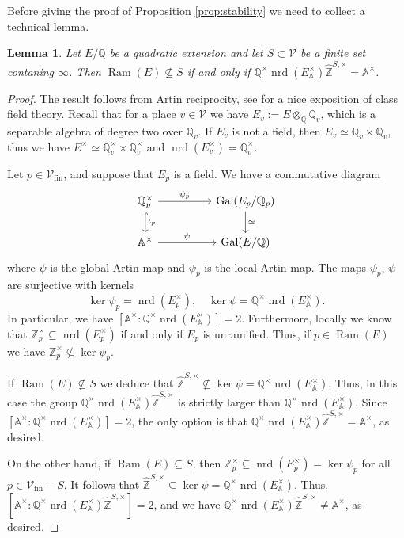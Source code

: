 \documentclass{article}
\newtheorem{lem}{Lemma}[section]
\theoremstyle{named}
\newcommand{\Z}{\mathbb{Z}}
\newcommand{\A}{\mathbb{A}}
\newcommand{\Q}{\mathbb{Q}}
\newcommand{\Pl}{\mathcal{V}}
\newcommand{\Primes}{\mathcal{V}_{\text{fin}}}
\DeclareMathOperator{\Gal}{Gal}
\DeclareMathOperator{\Ram}{Ram}
\DeclareMathOperator{\nrd}{nrd}
\begin{document}
Before giving the proof of Proposition \ref{prop:stability} we need to collect a technical lemma. 

\begin{lem}\label{lem:subgroupequaltoideles}
Let $E/\Q$ be a quadratic extension and let $S \subset \Pl$ be a finite set contaning $\infty$. Then $\Ram(E) \nsubseteq S$ if and only if $\Q^\times \nrd(E_\A^\times) \widehat{\Z}^{S, \times} = \A^\times$.
\end{lem}
\begin{proof}
The result follows from Artin reciprocity, see \cite[Chapters VI and VII]{casselsfrohlich} for a nice exposition of class field theory. Recall that for a place $v \in \Pl$ we have $E_v := E \otimes_\Q \Q_v$, which is a separable algebra of degree two over $\Q_v$. If $E_v$ is not a field, then $E_v \simeq \Q_v \times \Q_v$, thus we have $E^\times \simeq \Q_v^\times \times \Q_v^\times$ and $\nrd(E_v^\times) = \Q_v^\times$. 

Let $p \in \Primes$, and suppose that $E_p$ is a field. We have a commutative diagram 
\begin{equation*}
\begin{tikzcd}
\Q_p^\times \arrow[rr, "\psi_p"] \arrow[d, hook, "\iota_p"] &  & \Gal(E_p/\Q_p) \arrow[d, "\simeq"] \\
\A^\times \arrow[rr, "\psi"]                     &  & \Gal(E/\Q)                    
\end{tikzcd}
\end{equation*}
where $\psi$ is the global Artin map and $\psi_p$ is the local Artin map. The maps $\psi_p$, $\psi$ are surjective with kernels 
\begin{equation*}
    \ker \psi_p = \nrd(E_p^\times), \quad \ker \psi = \Q^\times \nrd(E_\A^\times).
\end{equation*}
In particular, we have $[\A^\times: \Q^\times \nrd(E_\A^\times)] = 2$. Furthermore, locally we know that $\Z_p^\times \subseteq \nrd(E_p^\times)$ if and only if $E_p$ is unramified. Thus, if $p \in \Ram(E)$ we have $\Z_p^\times \nsubseteq \ker \psi_p$. 

If $\Ram(E) \nsubseteq S$ we deduce that   $\widehat{\Z}^{S, \times} \nsubseteq \ker \psi = \Q^\times \nrd(E_\A^\times)$. Thus, in this case the group $\Q^\times \nrd(E_\A^\times) \widehat{\Z}^{S, \times}$ is strictly larger than $\Q^\times \nrd(E_\A^\times)$. Since $[\A^\times: \Q^\times \nrd(E_\A^\times)] = 2$, the only option is that $\Q^\times \nrd(E_\A^\times) \widehat{\Z}^{S, \times} = \A^\times$, as desired.

On the other hand, if $\Ram(E) \subseteq S$, then $\Z_p^\times \subseteq \nrd(E_p^\times) = \ker \psi_p$ for all $p \in \Primes - S$. It follows that $\widehat{\Z}^{S, \times} \subseteq \ker \psi = \Q^\times \nrd(E_\A^\times)$. Thus, $[\A^\times: \Q^\times \nrd(E_\A^\times)\widehat{\Z}^{S, \times}] = 2$, and we have $ \Q^\times \nrd(E_\A^\times)\widehat{\Z}^{S, \times} \neq \A^\times$, as desired.
\end{proof}
\end{document}
